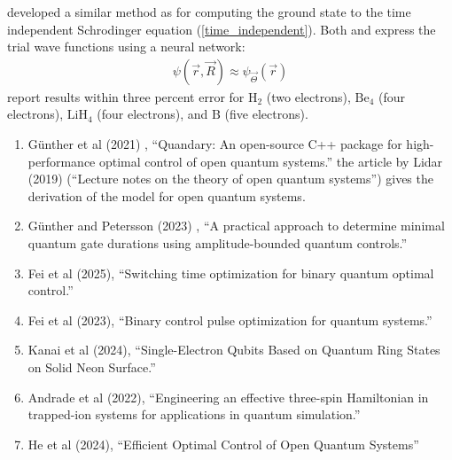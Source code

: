 \documentclass[]{article}
\begin{document}
\par\noindent
\cite{hermann2020deep} developed a similar method as \cite{HAN2019108929}
for computing the ground state to the
time independent Schrodinger equation (\ref{time_independent}).  Both
\cite{hermann2020deep} and \cite{HAN2019108929} express the trial 
wave functions using a neural network:
\begin{eqnarray}
\psi(\vec{r},\vec{R})\approx \psi_{\vec{\Theta}}(\vec{r})
\end{eqnarray}
\cite{hermann2020deep} report results within three percent error for
$\mbox{H}_{2}$ (two electrons), 
$\mbox{Be}_{4}$ (four electrons), 
$\mbox{LiH}_{4}$ (four electrons), and
$\mbox{B}$ (five electrons).


\begin{enumerate}
\item Günther et al (2021) \cite{9651392}, ``Quandary: An open-source C++ package for high-performance optimal control of open quantum systems.'' the article
by Lidar (2019)\cite{lidar2019lecture} (``Lecture notes on the theory of open quantum systems'') gives the derivation of the model for open quantum systems.
\item Günther and Petersson (2023) \cite{gunther2023practical}, ``A practical approach to determine minimal quantum gate durations using amplitude-bounded quantum controls.''
\item Fei et al (2025)\cite{fei2025switching}, ``Switching time optimization for binary quantum optimal control.''
\item Fei et al (2023)\cite{fei2023binary}, ``Binary control pulse optimization for quantum systems.''
\item Kanai et al (2024)\cite{PhysRevLett.132.250603}, ``Single-Electron Qubits Based on Quantum Ring States on Solid Neon Surface.''
\item Andrade et al (2022)\cite{Andrade_2022}, ``Engineering an effective three-spin Hamiltonian in trapped-ion systems for applications in quantum simulation.''
\item He et al (2024)\cite{he2024efficientoptimalcontrolopen}, ``Efficient Optimal Control of Open Quantum Systems''

\end{enumerate}
\end{document}
